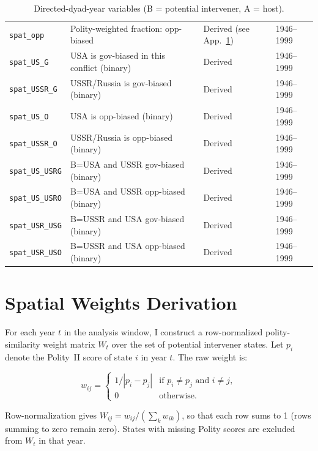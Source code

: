 \begin{table}[p]
\begin{tabular}{@{}lp{5cm}ll@{}}
    \texttt{spat\_opp} & Polity-weighted fraction: opp-biased & Derived (see App.~\ref{app:spatial}) & 1946--1999 \\
    \texttt{spat\_US\_G} & USA is gov-biased in this conflict (binary) & Derived & 1946--1999 \\
    \texttt{spat\_USSR\_G} & USSR/Russia is gov-biased (binary) & Derived & 1946--1999 \\
    \texttt{spat\_US\_O} & USA is opp-biased (binary) & Derived & 1946--1999 \\
    \texttt{spat\_USSR\_O} & USSR/Russia is opp-biased (binary) & Derived & 1946--1999 \\
    \texttt{spat\_US\_USRG} & B=USA and USSR gov-biased (binary) & Derived & 1946--1999 \\
    \texttt{spat\_US\_USRO} & B=USA and USSR opp-biased (binary) & Derived & 1946--1999 \\
    \texttt{spat\_USR\_USG} & B=USSR and USA gov-biased (binary) & Derived & 1946--1999 \\
    \texttt{spat\_USR\_USO} & B=USSR and USA opp-biased (binary) & Derived & 1946--1999 \\
    \bottomrule
  \end{tabular}
  \caption{Directed-dyad-year variables (B = potential intervener, A = host).}
  \label{tab:dyad-vars}
\end{table}

\section{Spatial Weights Derivation}
\label{app:spatial}

For each year $t$ in the analysis window, I construct a row-normalized
polity-similarity weight matrix $W_t$ over the set of potential intervener
states.  Let $p_i$ denote the Polity~II score of state $i$ in year $t$.  The
raw weight is:

\begin{equation*}
w_{ij} = \begin{cases}
1 / |p_i - p_j| & \text{if } p_i \neq p_j \text{ and } i \neq j, \\
0               & \text{otherwise.}
\end{cases}
\end{equation*}

Row-normalization gives $W_{ij} = w_{ij} / (\sum_k w_{ik})$, so that each row
sums to 1 (rows summing to zero remain zero).  States with missing Polity scores
are excluded from $W_t$ in that year.

